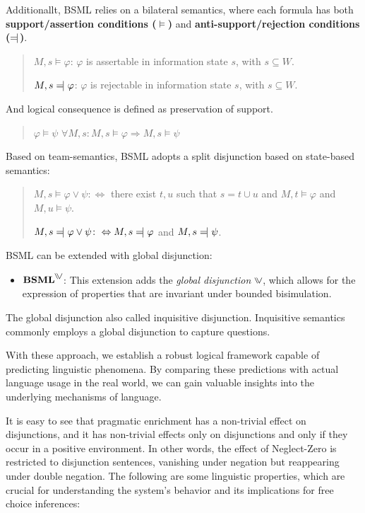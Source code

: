 Additionallt, BSML relies on a bilateral semantics, where each formula has both \textbf{support/assertion conditions ($\models$)} and \textbf{anti-support/rejection conditions ($\leftmodels$)}.

\begin{quote}
    $M, s \models \varphi$: \( \varphi \) is assertable in information state \( s \), with \( s \subseteq W \).

    $M, s \leftmodels \varphi$: $\varphi$ is rejectable in information state $s$, with $s \subseteq W$.
\end{quote}

And logical consequence is defined as preservation of support. 

\begin{quote}
\(\varphi \models \psi\) \quad {} \quad $\forall M, s : M, s \models \varphi \Rightarrow M, s \models \psi$
\end{quote}

Based on team-semantics, BSML adopts a split disjunction based on state-based semantics:

\begin{quote}
    $M, s \models \varphi \vee \psi \colon \Leftrightarrow$ there exist $t, u$ such that $s = t \cup u$ and $M, t \models \varphi$ and $M, u \models \psi$.
    
    $M, s \leftmodels \varphi \vee \psi \colon \Leftrightarrow M, s \leftmodels \varphi$ and $M, s \leftmodels \psi$.
\end{quote}


BSML can be extended with global disjunction:
\begin{itemize}
    \item \(\textbf{BSML}^{\inqdisj}\): This extension adds the \textit{global disjunction} \(\inqdisj\), which allows for the expression of properties that are invariant under bounded bisimulation.
\end{itemize}

The global disjunction also called inquisitive disjunction. 
Inquisitive semantics commonly employs a global disjunction to capture questions. 


With these approach, we establish a robust logical framework capable of predicting linguistic phenomena. 
By comparing these predictions with actual language usage in the real world, we can gain valuable insights into the underlying mechanisms of language.


It is easy to see that pragmatic enrichment has a non-trivial effect on disjunctions, 
and it has non-trivial effects only on disjunctions and only if they occur in a positive environment. 
In other words, the effect of Neglect-Zero is restricted to disjunction sentences, vanishing under negation but reappearing under double negation.
The following are some linguistic properties, which are crucial for understanding the system's behavior and its implications for free choice inferences:

